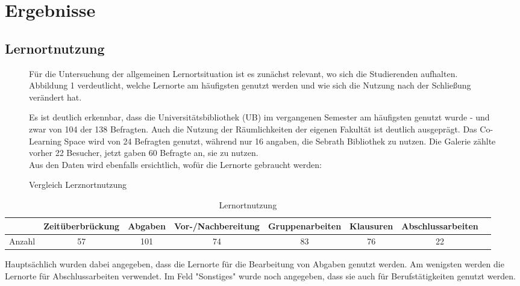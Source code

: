 \documentclass[11pt, a4paper]{article}
\begin{document}
\newpage
\section{Ergebnisse}
\subsection{Lernortnutzung}
\begin{figure}[h]
Für die Untersuchung der allgemeinen Lernortsituation ist es zunächst relevant, wo sich die Studierenden aufhalten. Abbildung 1 verdeutlicht, welche Lernorte am häufigsten genutzt werden und wie sich die Nutzung nach der Schließung verändert hat.

 
 \caption{Vergleich Lerznortnutzung }
\leavevmode

Es ist deutlich erkennbar, dass die Universitätsbibliothek (UB) im vergangenen Semester am häufigsten genutzt wurde - und zwar von 104 der 138 Befragten. Auch die Nutzung der Räumlichkeiten der eigenen Fakultät ist deutlich ausgeprägt. Das Co-Learning Space wird von 24  Befragten genutzt, während nur 16 angaben, die Sebrath Bibliothek zu nutzen. 
Die Galerie zählte vorher 22 Besucher, jetzt gaben 60 Befragte an, sie zu nutzen.\\

Aus den Daten wird ebenfalls ersichtlich, wofür die Lernorte gebraucht werden:



\end{figure}
\begin{table}[h]
	\begin{tabular}{c|ccccccc}
		& Zeitüberbrückung & Abgaben & Vor-/Nachbereitung & Gruppenarbeiten & Klausuren & Abschlussarbeiten \\ \hline
		Anzahl & 57            & 101             & 74                          & 83                     & 76                 & 22                      
	\end{tabular}
		\caption{Lernortnutzung}
\end{table}

Hauptsächlich wurden dabei angegeben, dass die Lernorte für die Bearbeitung von Abgaben genutzt werden. Am wenigsten werden die Lernorte für Abschlussarbeiten verwendet. Im Feld "Sonstiges" wurde noch angegeben, dass sie auch für Berufstätigkeiten genutzt werden.


\leavevmode
\end{document}
